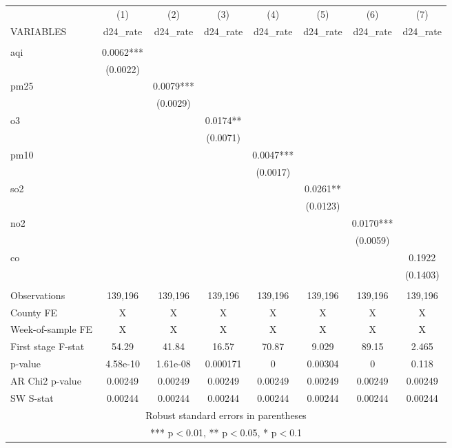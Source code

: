 \documentclass[]{article}
\begin{document}
\begin{tabular}{lccccccc} \hline
 & (1) & (2) & (3) & (4) & (5) & (6) & (7) \\
VARIABLES & d24\_rate & d24\_rate & d24\_rate & d24\_rate & d24\_rate & d24\_rate & d24\_rate \\ \hline
 &  &  &  &  &  &  &  \\
aqi & 0.0062*** &  &  &  &  &  &  \\
 & (0.0022) &  &  &  &  &  &  \\
pm25 &  & 0.0079*** &  &  &  &  &  \\
 &  & (0.0029) &  &  &  &  &  \\
o3 &  &  & 0.0174** &  &  &  &  \\
 &  &  & (0.0071) &  &  &  &  \\
pm10 &  &  &  & 0.0047*** &  &  &  \\
 &  &  &  & (0.0017) &  &  &  \\
so2 &  &  &  &  & 0.0261** &  &  \\
 &  &  &  &  & (0.0123) &  &  \\
no2 &  &  &  &  &  & 0.0170*** &  \\
 &  &  &  &  &  & (0.0059) &  \\
co &  &  &  &  &  &  & 0.1922 \\
 &  &  &  &  &  &  & (0.1403) \\
 &  &  &  &  &  &  &  \\
Observations & 139,196 & 139,196 & 139,196 & 139,196 & 139,196 & 139,196 & 139,196 \\
County FE & X & X & X & X & X & X & X \\
Week-of-sample FE & X & X & X & X & X & X & X \\
First stage F-stat & 54.29 & 41.84 & 16.57 & 70.87 & 9.029 & 89.15 & 2.465 \\
p-value & 4.58e-10 & 1.61e-08 & 0.000171 & 0 & 0.00304 & 0 & 0.118 \\
AR Chi2 p-value & 0.00249 & 0.00249 & 0.00249 & 0.00249 & 0.00249 & 0.00249 & 0.00249 \\
 SW S-stat & 0.00244 & 0.00244 & 0.00244 & 0.00244 & 0.00244 & 0.00244 & 0.00244 \\ \hline
\multicolumn{8}{c}{ Robust standard errors in parentheses} \\
\multicolumn{8}{c}{ *** p$<$0.01, ** p$<$0.05, * p$<$0.1} \\
\end{tabular}
\end{document}
